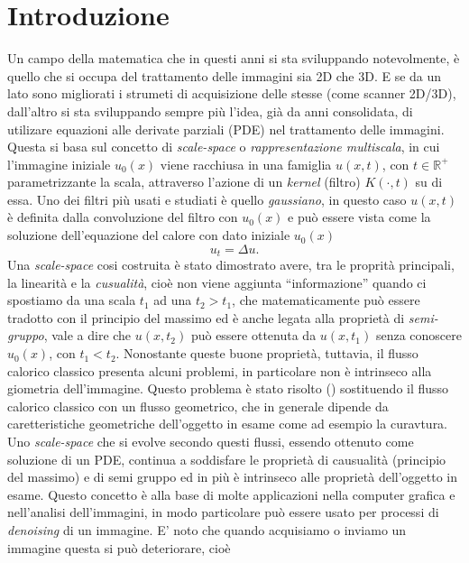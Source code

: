 \chapter*{Introduzione}
{}

Un campo della matematica che in questi anni si sta sviluppando
notevolmente, è quello che si occupa del trattamento delle immagini
sia 2D che 3D. E se da un lato sono migliorati i strumeti di
acquisizione delle stesse (come  scanner 2D/3D), dall'altro si sta
sviluppando sempre più l'idea, già da anni consolidata, di utilizare
equazioni alle derivate parziali (PDE) nel trattamento delle
immagini. Questa si basa sul concetto di \emph{scale-space} o
\emph{rappresentazione multiscala}, in cui l'immagine
iniziale $u_0(x)$ viene racchiusa in una famiglia $u(x,t)$, con
$t\in\mathbb{R}^+$ parametrizzante la scala, attraverso l'azione di un
\emph{kernel} (filtro) $K(\cdot,t)$ su di essa. Uno dei filtri più
usati  e studiati è quello \emph{gaussiano}, in questo caso  $u(x,t)$
è definita dalla convoluzione del filtro con $u_0(x)$ e può essere
vista come la soluzione dell'equazione del calore con dato iniziale $u_0(x)$
\[
u_t=\Delta u.
\]
Una \emph{scale-space} cosi costruita  è stato dimostrato avere, tra
le proprità principali, la linearità e la \emph{cusualità}, cioè
non viene aggiunta  ``informazione'' quando ci spostiamo da una scala
$t_1$ ad una $t_2>t_1$, che matematicamente può essere tradotto con il
principio del massimo ed  è anche legata alla proprietà di
\emph{semi-gruppo}, vale a dire che $u(x,t_2)$ può essere ottenuta da
$u(x,t_1)$ senza conoscere $u_0(x)$, con $t_1<t_2$.   Nonostante queste
buone proprietà, tuttavia, il flusso calorico classico presenta alcuni
problemi, in particolare non è intrinseco alla giometria
dell'immagine. Questo problema è stato risolto
(\cite[][]{sapiro:tann}) sostituendo il flusso calorico classico con
un flusso  geometrico, che in generale dipende da caretteristiche
geometriche dell'oggetto in esame come ad esempio la curavtura. Uno
\emph{scale-space} che si evolve secondo questi flussi, essendo
ottenuto come soluzione di un PDE, continua a soddisfare le proprietà
di causualità (principio del massimo) e di semi gruppo ed in più è
intrinseco alle proprietà dell'oggetto in esame. 
Questo concetto è alla base di molte applicazioni nella computer
grafica e nell'analisi dell'immagini, in modo particolare può essere
usato per processi di \emph{denoising} di un immagine. E' noto che
quando acquisiamo o inviamo un immagine questa si può deteriorare, cioè 
